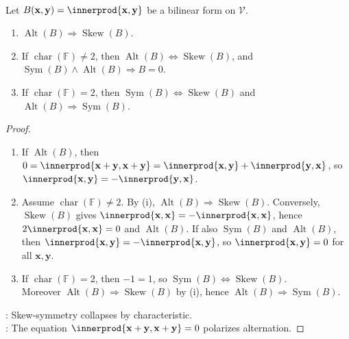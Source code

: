 \begin{proposition} \label{prop:form-type-relations-by-characteristic} \\
Let $B(\mathbf{x},\mathbf{y})=\innerprod{\mathbf{x},\mathbf{y}}$ be a bilinear form on $\mathcal{V}$.
\begin{enumerate}[label=(\roman*)]
\setlength{\itemsep}{0pt}
\item $\operatorname{Alt}(B)\Rightarrow\operatorname{Skew}(B)$.
\item If $\operatorname{char}(\mathbb{F})\neq2$, then $\operatorname{Alt}(B)\Longleftrightarrow\operatorname{Skew}(B)$, and $\operatorname{Sym}(B)\wedge\operatorname{Alt}(B)\Rightarrow B=0$.
\item If $\operatorname{char}(\mathbb{F})=2$, then $\operatorname{Sym}(B)\Longleftrightarrow\operatorname{Skew}(B)$ and $\operatorname{Alt}(B)\Rightarrow\operatorname{Sym}(B)$.
\end{enumerate}
\begin{proof}
\begin{enumerate}[label=(\roman*)]
\setlength{\itemsep}{0pt}
\item If $\operatorname{Alt}(B)$, then $0=\innerprod{\mathbf{x}+\mathbf{y},\mathbf{x}+\mathbf{y}} =\innerprod{\mathbf{x},\mathbf{y}}+\innerprod{\mathbf{y},\mathbf{x}}$, so $\innerprod{\mathbf{x},\mathbf{y}}=-\innerprod{\mathbf{y},\mathbf{x}}$.
\item Assume $\operatorname{char}(\mathbb{F})\neq2$. By (i), $\operatorname{Alt}(B)\Rightarrow\operatorname{Skew}(B)$. Conversely, $\operatorname{Skew}(B)$ gives $\innerprod{\mathbf{x},\mathbf{x}}=-\innerprod{\mathbf{x},\mathbf{x}}$, hence $2\innerprod{\mathbf{x},\mathbf{x}}=0$ and $\operatorname{Alt}(B)$. If also $\operatorname{Sym}(B)$ and $\operatorname{Alt}(B)$, then $\innerprod{\mathbf{x},\mathbf{y}}=-\innerprod{\mathbf{x},\mathbf{y}}$, so $\innerprod{\mathbf{x},\mathbf{y}}=0$ for all $\mathbf{x},\mathbf{y}$.
\item If $\operatorname{char}(\mathbb{F})=2$, then $-1=1$, so $\operatorname{Sym}(B)\Longleftrightarrow\operatorname{Skew}(B)$.\\
Moreover $\operatorname{Alt}(B)\Rightarrow\operatorname{Skew}(B)$ by (i), hence $\operatorname{Alt}(B)\Rightarrow\operatorname{Sym}(B)$.
\end{enumerate}
: Skew-symmetry collapses by characteristic.\\
: The equation $\innerprod{\mathbf{x}+\mathbf{y},\mathbf{x}+\mathbf{y}}=0$ polarizes alternation.
\end{proof}
\end{proposition}

